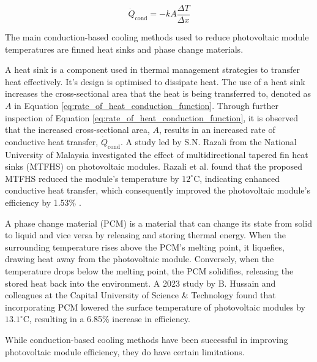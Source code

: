 \begin{equation}
    \dot{Q}_\text{cond} = -kA\frac{\Delta T}{\Delta x}
    \label{eq:rate_of_heat_conduction_function}
\end{equation}

The main conduction-based cooling methods used to reduce photovoltaic module temperatures are finned heat sinks and phase change materials.\vspace{0.5em}

A heat sink is a component used in thermal management strategies to transfer heat effectively. It's design is optimised to dissipate heat. \cite{Kumar2024QualitativeReview} The use of a heat sink increases the cross-sectional area that the heat is being transferred to, denoted as $A$ in Equation \ref{eq:rate_of_heat_conduction_function}. Through further inspection of Equation \ref{eq:rate_of_heat_conduction_function}, it is observed that the increased cross-sectional area, $A$, results in an increased rate of conductive heat transfer, $\dot{Q}_\text{cond}$. A study led by S.N. Razali from the National University of Malaysia investigated the effect of multidirectional tapered fin heat sinks (MTFHS) on photovoltaic modules. Razali et al. found that the proposed MTFHS reduced the module's temperature by $12^\circ \text{C}$, indicating enhanced conductive heat transfer, which consequently improved the photovoltaic module's efficiency by 1.53\% \cite{Razali2023PerformanceMTFHS}.\vspace{0.5em}

A phase change material (PCM) is a material that can change its state from solid to liquid and vice versa by releasing and storing thermal energy. \cite{Nicholas2019ActivatedMaterial} When the surrounding temperature rises above the PCM’s melting point, it liquefies, drawing heat away from the photovoltaic module. Conversely, when the temperature drops below the melting point, the PCM solidifies, releasing the stored heat back into the environment. A 2023 study by B. Hussain and colleagues at the Capital University of Science \& Technology found that incorporating PCM lowered the surface temperature of photovoltaic modules by $13.1^\circ \text{C}$, resulting in a 6.85\% increase in efficiency. \cite{Hussain2023Phase}\vspace{0.5em}

While conduction-based cooling methods have been successful in improving photovoltaic module efficiency, they do have certain limitations.\par
\par

